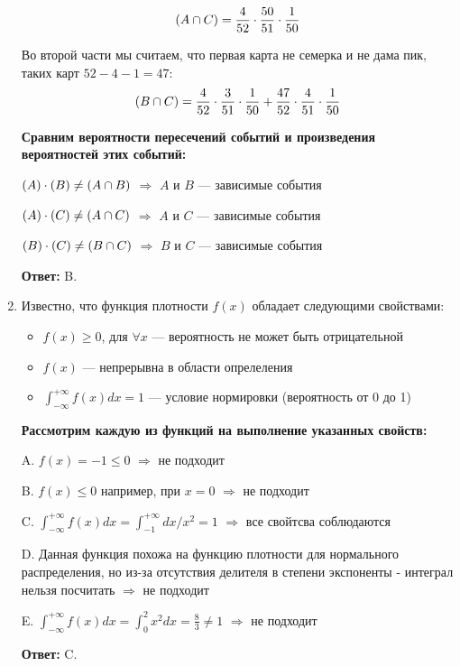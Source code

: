\documentclass[a4paper]{article} %
\let\P\relax
\DeclareMathOperator{\P}{\mathbb{P}}
\renewcommand{\le}{\leqslant}
\renewcommand{\ge}{\geqslant}
\begin{document}
\begin{enumerate}
    \[
    \P(A \cap C) = \frac{4}{52}\cdot\frac{50}{51}\cdot\frac{1}{50} 
    \]
    
    Во второй части мы считаем, что первая карта не семерка и не дама пик, таких карт $52-4-1=47$:
    \[
    \P(B \cap C) = \frac{4}{52}\cdot\frac{3}{51}\cdot\frac{1}{50} + \frac{47}{52}\cdot\frac{4}{51}\cdot\frac{1}{50}
    \] 
    
    \textbf{Сравним вероятности пересечений событий и произведения вероятностей этих событий:}
    
    $ \P(A) \cdot \P(B) \neq \P(A \cap B) $ $\Rightarrow$ $A$ и $B$ — зависимые события
    
    $ \P(A) \cdot \P(C) \neq \P(A \cap C) $ $\Rightarrow$ $A$ и $C$ — зависимые события
    
    $ \P(B) \cdot \P(C) \neq \P(B \cap C) $ $\Rightarrow$ $B$ и $C$ — зависимые события
    
    \textbf{Ответ:} B.
    
    
    \item
    Известно, что функция плотности $f(x)$ обладает следующими свойствами:
    \begin{itemize}
        \item $f(x) \ge 0$, для $ \forall x$ — вероятность не может быть отрицательной
        \item $f(x)$ — непрерывна в области опрелеления
        \item $ \int_{-\infty}^{+\infty} f(x) dx = 1$ — условие нормировки (вероятность от 0 до 1)
    \end{itemize}
    
    \textbf{Рассмотрим каждую из функций на выполнение указанных свойств:}
    
    A. $f(x) = -1 \le 0$ $\Rightarrow$ не подходит
    
    B. $f(x) \le 0$ например, при $x = 0$ $\Rightarrow$ не подходит
    
    C. $ \int_{-\infty}^{+\infty} f(x) dx = \int_{-1}^{+\infty} dx/x^2 = 1 $ $\Rightarrow$ все свойтсва соблюдаются
    
    D. Данная функция похожа на функцию плотности для нормального распределения, но из-за отсутствия делителя в степени экспоненты - интеграл нельзя посчитать $\Rightarrow$ не подходит
    
    E. $ \int_{-\infty}^{+\infty} f(x) dx = \int_{0}^{2} x^2 dx = \frac{8}{3} \neq 1 $ $\Rightarrow$ не подходит
    
    \textbf{Ответ:} C.
    

\end{enumerate}
\end{document}
